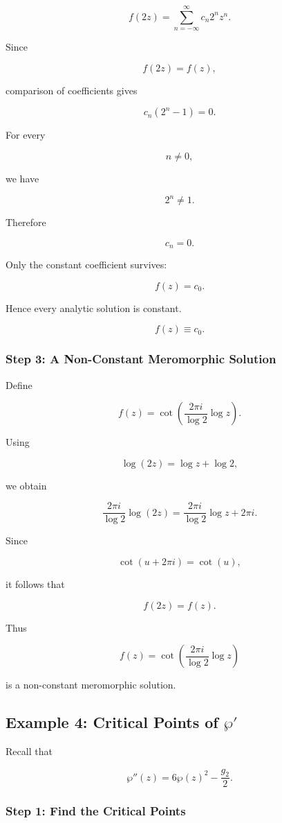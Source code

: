 \documentclass[12pt,a4paper]{article}
\theoremstyle{notespace}
\begin{document}
\[
f(2z)
=
\sum_{n=-\infty}^{\infty}
c_n 2^n z^n.
\]

Since

\[
f(2z)=f(z),
\]

comparison of coefficients gives

\[
c_n(2^n-1)=0.
\]

For every

\[
n\neq0,
\]

we have

\[
2^n\neq1.
\]

Therefore

\[
c_n=0.
\]

Only the constant coefficient survives:

\[
f(z)=c_0.
\]

Hence every analytic solution is constant.

\[
\boxed{
	f(z)\equiv c_0.
}
\]

\subsubsection*{Step 3: A Non-Constant Meromorphic Solution}

Define

\[
f(z)
=
\cot\!\left(
\frac{2\pi i}{\log 2}
\log z
\right).
\]

Using

\[
\log(2z)
=
\log z+\log2,
\]

we obtain

\[
\frac{2\pi i}{\log2}
\log(2z)
=
\frac{2\pi i}{\log2}
\log z
+
2\pi i.
\]

Since

\[
\cot(u+2\pi i)=\cot(u),
\]

it follows that

\[
f(2z)=f(z).
\]

Thus

\[
\boxed{
	f(z)
	=
	\cot\!\left(
	\frac{2\pi i}{\log 2}
	\log z
	\right)
}
\]

is a non-constant meromorphic solution.

\bigskip

\subsection{Example 4: Critical Points of \(\wp'\)}

Recall that

\[
\wp''(z)
=
6\wp(z)^2-\frac{g_2}{2}.
\]

\subsubsection*{Step 1: Find the Critical Points}
\end{document}
